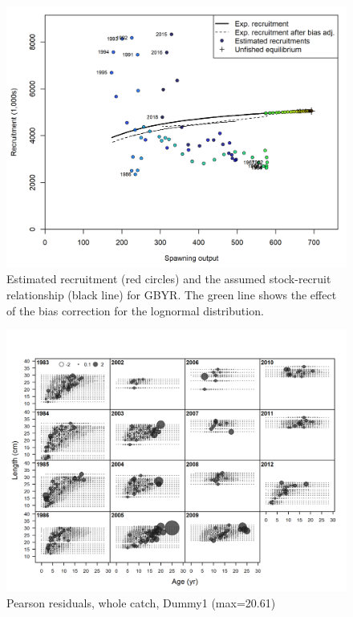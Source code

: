 \documentclass[12pt,]{article}
\begin{document}
\begin{figure}
\centering
\includegraphics{r4ss/plots_mod1/SR_curve2.png}
\caption{Estimated recruitment (red circles) and the assumed
stock-recruit relationship (black line) for GBYR. The green line shows
the effect of the bias correction for the lognormal distribution.
\label{fig:SR_curve2}}
\end{figure}

\FloatBarrier

\begin{figure}
\centering
\includegraphics{./r4ss/plots_mod1/comp_condAALfit_residsflt12mkt0.png}
\caption{Pearson residuals, whole catch, Dummy1 (max=20.61)
\label{fig:mod1_4_comp_condAALfit_residsflt12mkt0}}
\end{figure}
\end{document}
